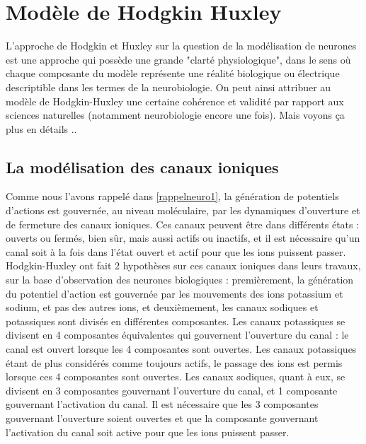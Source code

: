 \documentclass[12pt]{scrartcl}
\begin{document}
\section{Modèle de Hodgkin Huxley}\label{hh}
L'approche de Hodgkin et Huxley sur la question de la modélisation de neurones est une approche qui possède une grande "clarté physiologique", dans le sens où chaque composante du modèle représente une réalité biologique ou électrique descriptible dans les termes de la neurobiologie. On peut ainsi attribuer au modèle de Hodgkin-Huxley une certaine cohérence et validité par rapport aux sciences naturelles (notamment neurobiologie encore une fois). Mais voyons ça plus en détails ..
\subsection{La modélisation des canaux ioniques}
Comme nous l'avons rappelé dans \ref{rappelneuro1}, la génération de potentiels d'actions est gouvernée, au niveau moléculaire, par les dynamiques d'ouverture et de fermeture des canaux ioniques. Ces canaux peuvent être dans différents états : ouverts ou fermés, bien sûr, mais aussi actifs ou inactifs, et il est nécessaire qu'un canal soit à la fois dans l'état ouvert et actif pour que les ions puissent passer. Hodgkin-Huxley ont fait 2 hypothèses sur ces canaux ioniques dans leurs travaux, sur la base d'observation des neurones biologiques : premièrement, la génération du potentiel d'action est gouvernée par les mouvements des ions potassium et sodium, et pas des autres ions, et deuxièmement, les canaux sodiques et potassiques sont divisés en différentes composantes. Les canaux potassiques se divisent en 4 composantes équivalentes qui gouvernent l'ouverture du canal : le canal est ouvert lorsque les 4 composantes sont ouvertes. Les canaux potassiques étant de plus considérés comme toujours actifs, le passage des ions est permis lorsque ces 4 composantes sont ouvertes. Les canaux sodiques, quant à eux, se divisent en 3 composantes gouvernant l'ouverture du canal, et 1 composante gouvernant l'activation du canal. Il est nécessaire que les 3 composantes gouvernant l'ouverture soient ouvertes et que la composante gouvernant l'activation du canal soit active pour que les ions puissent passer.
\end{document}
